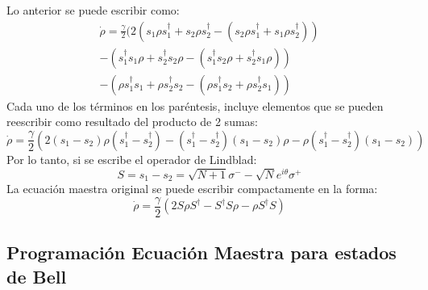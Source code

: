 \documentclass{book}
\begin{document}
Lo anterior se puede escribir como:
\begin{equation}\begin{aligned}{\dot{\rho}=\frac{\gamma}{2}(2(s_1\rho s_1^\dag+s_2\rho s_2^\dag-(s_2 \rho s_1^\dag +s_1\rho s_2^\dag))} \\{ -(s_1^\dag s_1\rho+ s_2^\dag s_2 \rho -(s_1^\dag s_2\rho + s_2^\dag s_1\rho))}\\  {-(\rho s_1^\dag s_1+\rho s_2^\dag s_2  -(\rho s_1^\dag s_2 +\rho s_2^\dag s_1) )}\end{aligned}\end{equation}
Cada uno de los términos en los paréntesis, incluye elementos que se pueden reescribir como resultado del producto de 2 sumas:
\begin{equation}{\dot{\rho}=\frac{\gamma}{2}(2(s_1-s_2)\rho(s_1^\dag-s_2^\dag)-(s_1^\dag-s_2^\dag)(s_1-s_2)\rho-\rho(s_1^\dag-s_2^\dag)(s_1-s_2))}\end{equation}
Por lo tanto, si se escribe el operador de Lindblad:
\begin{equation}{S=s_1-s_2=\sqrt{N+1}\sigma^--\sqrt{N}e^{i\theta}\sigma^+}\end{equation}
La ecuación maestra original se puede escribir compactamente en la forma:
\begin{equation}{\dot{\rho}=\frac{\gamma}{2}(2S\rho S^\dag-S^\dag S\rho-\rho S^\dag S)}\end{equation}
\subsection{{Programación Ecuación Maestra para estados de Bell}}
\end{document}

